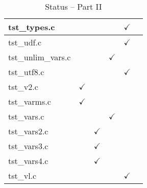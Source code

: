 \begin{table}[H]
\begin{tabular}{|l|c|c|c|c|c|}
tst\_types.c   &   &   &   & $\checkmark$  &   \\ \hline
tst\_udf.c   &   &   &   &  $\checkmark$ &   \\ \hline
tst\_unlim\_vars.c   &   &   &  $\checkmark$ &   &   \\ \hline
tst\_utf8.c   &   &   &   & $\checkmark$  &   \\ \hline
tst\_v2.c   & $\checkmark$  &   &   &   &   \\ \hline
tst\_varms.c   &  $\checkmark$ &   &   &   &   \\ \hline
tst\_vars.c   &   &   & $\checkmark$  &   &   \\ \hline
tst\_vars2.c   &   & $\checkmark$  &   &   &   \\ \hline
tst\_vars3.c   &   & $\checkmark$  &   &   &   \\ \hline
tst\_vars4.c   &   & $\checkmark$  &   &   &   \\ \hline
tst\_vl.c   &   &   &   & $\checkmark$  &   \\ \hline
\hline
\end{tabular}
\caption{Status -- Part II}
\end{table}

